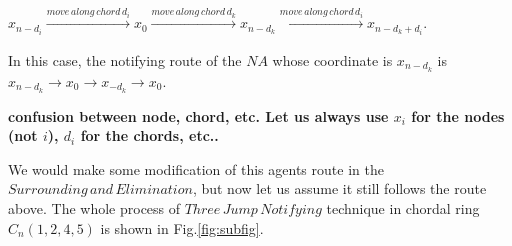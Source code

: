 $x_{n-d_i}\xrightarrow [] {move\,along\,chord\,d_i}x_0\xrightarrow [] {move\,along\,chord\,d_k}x_{n-d_k}\xrightarrow []{move\,along\,chord\,d_i}x_{n-d_k+d_i}$.
 
 In this case, the notifying route of the $NA$ whose coordinate is $x_{n-d_k}$ is $x_{n-d_k}{\rightarrow}x_0{\rightarrow}x_{-d_k}{\rightarrow}x_0$.
 
 {\bf confusion between node, chord, etc. Let us always use $x_i$ for the nodes (not $i$), $d_i$ for the chords, etc..}
 
 We would make some modification of this agents route in the $Surrounding\,and\,Elimination$, but now let us assume it still follows the route above. The whole process of $Three\,Jump\,Notifying$ technique in chordal ring $C_n(1, 2, 4, 5)$ is shown in Fig.\ref{fig:subfig}. \\

%
%
%

